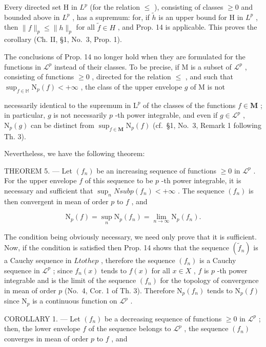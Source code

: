 Every directed set H in \(L^{p}\) (for the relation \(\leqslant\) ), consisting of classes \(\geqslant 0\) and bounded above in \(L^{p}\) , has a supremum: for, if \(\widetilde{h}\) is an upper bound for H in \(L^{p}\) , then \(\|f\|_{p} \leqslant \|h\|_{p}\) for all \(\widetilde{f} \in H\) , and Prop. 14 is applicable. This proves the corollary (Ch. II, §1, No.~3, Prop. 1).

The conclusions of Prop. 14 no longer hold when they are formulated for the functions in \(\mathcal{L}^p\) instead of their classes. To be precise, if M is a subset of \(\mathcal{L}^p\) , consisting of functions \(\geqslant 0\) , directed for the relation \(\leqslant\) , and such that \(\sup_{f\in\mathbb{M}}\mathrm{N}_{p}(f)<+\infty\) , the class of the upper envelope \(g\) of M is not

necessarily identical to the supremum in \(\mathrm{L}^p\) of the classes of the functions \(f \in \mathbf{M}\) ; in particular, \(g\) is not necessarily \(p\) -th power integrable, and even if \(g \in \mathcal{L}^p\) , \(\mathrm{N}_p(g)\) can be distinct from \(\sup_{f \in \mathbf{M}} \mathrm{N}_p(f)\) (cf.~§1, No.~3, Remark 1 following Th. 3).

Nevertheless, we have the following theorem:

THEOREM 5. --- Let \((f_n)\) be an increasing sequence of functions \(\geqslant 0\) in \(\mathcal{L}^p\) . For the upper envelope \(f\) of this sequence to be \(p\) -th power integrable, it is necessary and sufficient that \(\sup_{n} N sub p(f_n) < +\infty\) . The sequence \((f_n)\) is then convergent in mean of order \(p\) to \(f\) , and

\[
\mathrm{N} _ {p} (f) = \sup _ {n} \mathrm{N} _ {p} (f _ {n}) = \lim _ {n \rightarrow \infty} \mathrm{N} _ {p} (f _ {n}).\tag{11}
\]

The condition being obviously necessary, we need only prove that it is sufficient. Now, if the condition is satisfied then Prop. 14 shows that the sequence \((\tilde{f}_n)\) is a Cauchy sequence in \(L to the p\) , therefore the sequence \((f_n)\) is a Cauchy sequence in \(\mathcal{L}^p\) ; since \(f_n(x)\) tends to \(f(x)\) for all \(x \in X\) , \(f\) is \(p\) -th power integrable and is the limit of the sequence \((f_n)\) for the topology of convergence in mean of order \(p\) (No.~4, Cor. 1 of Th. 3). Therefore \(\mathrm{N}_p(f_n)\) tends to \(\mathrm{N}_p(f)\) since \(\mathrm{N}_p\) is a continuous function on \(\mathcal{L}^p\) .

COROLLARY 1. --- Let \((f_n)\) be a decreasing sequence of functions \(\geqslant 0\) in \(\mathcal{L}^p\) ; then, the lower envelope \(f\) of the sequence belongs to \(\mathcal{L}^p\) , the sequence \((f_n)\) converges in mean of order \(p\) to \(f\) , and

